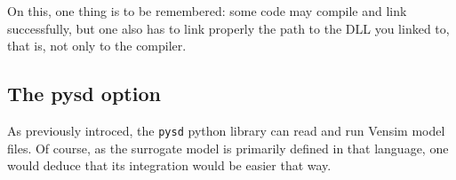 On this, one thing is to be remembered: some code may compile and link successfully, but one also has to link properly the path to the DLL you linked to, that is, not only to the compiler.









\subsection{The pysd option}

As previously introced, the \texttt{pysd} python library can read and run Vensim model files. Of course, as the surrogate model is primarily defined in that language, one would deduce that its integration would be easier that way.

